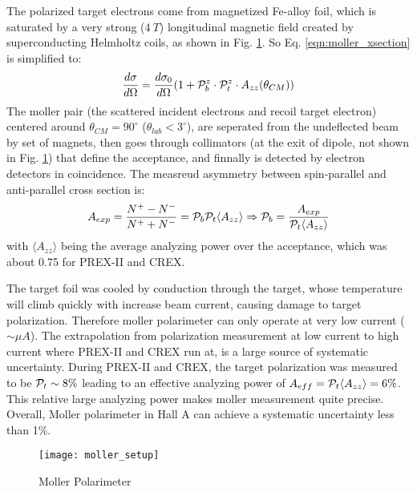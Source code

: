 The polarized target electrons come from magnetized Fe-alloy foil, which is 
saturated by a very strong ($4\ T$) longitudinal magnetic field created by 
superconducting Helmholtz coils, as shown in Fig. \ref{fig:moller_polarimeter}. 
So Eq. \ref{eqn:moller_xsection} is simplified to:
\begin{equation}
    \frac{d\sigma}{d\Omega} = \frac{d\sigma_0}{d\Omega} ( 1 + \mathcal{P}_b^z \cdot \mathcal{P}_t^z \cdot A_{zz}(\theta_{CM}))
    \label{eqn:moller_xsection_1}
\end{equation}
The moller pair (the scattered incident electrons and recoil target electron)
centered around $\theta_{CM} = 90^\circ$ ($\theta_{lab} < 3^\circ$), 
are seperated from the undeflected beam by set of magnets, then goes through
collimators (at the exit of dipole, not shown in Fig. \ref{fig:moller_polarimeter}) 
that define the acceptance, and finnally is detected by electron detectors in coincidence.
The measreud asymmetry between spin-parallel and anti-parallel cross section is:
\begin{equation}
    A_{exp} = \frac{N^+ - N^-}{N^+ + N^-} = \mathcal{P}_b \mathcal{P}_t \langle A_{zz} \rangle 
    \Rightarrow
    \mathcal{P}_b = \frac{A_{exp}}{\mathcal{P}_t \langle A_{zz} \rangle}
\end{equation}
with $\langle A_{zz} \rangle$ being the average analyzing power over the acceptance,
which was about 0.75 for PREX-II and CREX.

The target foil was cooled by conduction through the target, whose temperature 
will climb quickly with increase beam current, causing damage to target
polarization. Therefore moller polarimeter can only operate at very low current ($\sim \mu A$).
The extrapolation from polarization measurement at low current to high current
where PREX-II and CREX run at, is a large source of systematic uncertainty.
During PREX-II and CREX, the target polarization was measured to be $\mathcal{P}_t \sim 8\%$ 
leading to an effective analyzing power of $A_{eff} = \mathcal{P}_t\langle A_{zz} \rangle = 6\%$.
This relative large analyzing power makes moller measurement quite precise.
Overall, Moller polarimeter in Hall A can achieve a systematic uncertainty less
than 1\%.

\begin{figure}[h!]
    \centering
    \texttt{[image: moller\_setup]}
    \caption{Moller Polarimeter}
    \label{fig:moller_polarimeter}
\end{figure}

